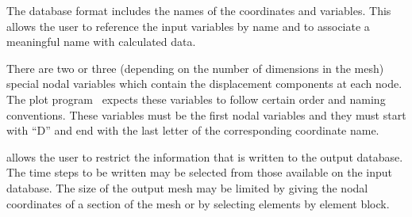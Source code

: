The \exo{} database format includes the names of the coordinates
and variables. This allows the user to reference the input variables by
name and to associate a meaningful name with calculated data.

There are two or three (depending on the number of dimensions in the
mesh) special nodal variables which contain the displacement components
at each node. The  plot program~\cite{bib:blot} expects these
variables to follow certain order and naming conventions. These
variables must be the first nodal variables and they must start with
``D'' and end with the last letter of the corresponding coordinate name.

\caps{\PROGRAM} allows the user to restrict the information that is
written to the output database. The time steps to be written may be
selected from those available on the input database. The size of the
output mesh may be limited by giving the nodal coordinates of a section
of the mesh or by selecting elements by element block.

